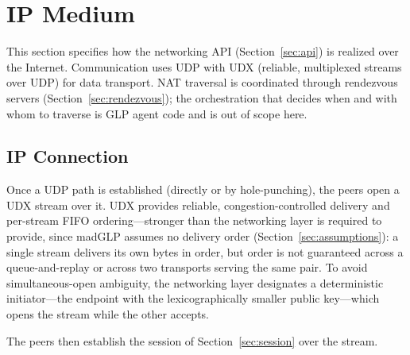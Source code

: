 \section{IP Medium}
\label{sec:ip}
This section specifies how the networking API (Section~\ref{sec:api}) is realized over the Internet.  Communication uses UDP with UDX (reliable, multiplexed streams over UDP) for data transport.  NAT traversal is coordinated through rendezvous servers (Section~\ref{sec:rendezvous}); the orchestration that decides when and with whom to traverse is GLP agent code and is out of scope here.

\subsection{IP Connection}
\label{sec:ip-connection}
Once a UDP path is established (directly or by hole-punching), the peers open a UDX stream over it.  UDX provides reliable, congestion-controlled delivery and per-stream FIFO ordering---stronger than the networking layer is required to provide, since madGLP assumes no delivery order (Section~\ref{sec:assumptions}): a single stream delivers its own bytes in order, but order is not guaranteed across a queue-and-replay or across two transports serving the same pair.  To avoid simultaneous-open ambiguity, the networking layer designates a deterministic initiator---the endpoint with the lexicographically smaller public key---which opens the stream while the other accepts.

The peers then establish the session of Section~\ref{sec:session} over the stream.

